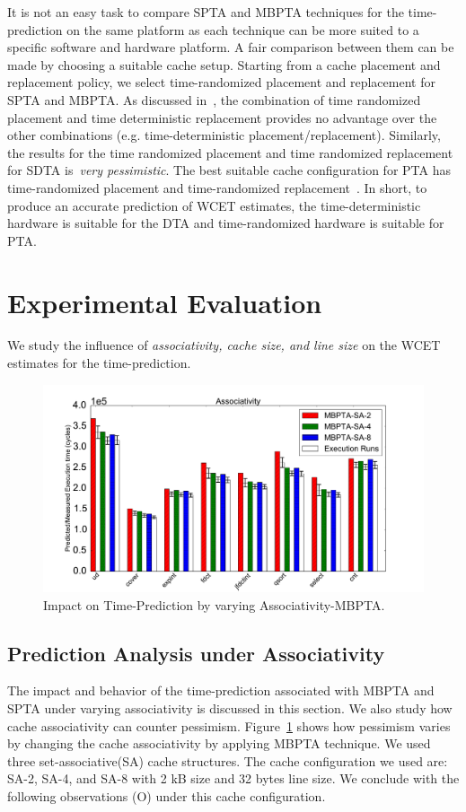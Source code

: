 It is not an easy task to compare SPTA and MBPTA techniques for the time-prediction on the same platform as each technique can be more suited to a specific software and hardware platform. A fair comparison between them can be made by choosing a suitable cache setup. Starting from a cache placement and replacement policy, we select time-randomized placement and replacement for SPTA and MBPTA. As discussed in~\cite{abella2014comparison}, the combination of time randomized placement and time deterministic replacement provides no advantage over the other combinations (e.g. time-deterministic placement/replacement). Similarly, the results for the time randomized placement and time randomized replacement for SDTA is~\textit{very pessimistic}. The best suitable cache configuration for PTA has time-randomized placement and time-randomized replacement~\cite{abella2014comparison}. In short, to produce an accurate prediction of WCET estimates, the time-deterministic hardware is suitable for the DTA and time-randomized hardware is suitable for PTA.
 
\section{Experimental Evaluation}
We study the influence of  \textit{associativity, cache size, and line size} on the WCET estimates for the time-prediction.

 \begin{figure}[tb!]
\centering
\includegraphics[scale=0.4]{figures/mbpta.pdf}
\caption{Impact on Time-Prediction by varying Associativity-MBPTA.}
\label{fig:MBPTA}
\end{figure}


\subsection{{Prediction Analysis under Associativity}}
The impact and behavior of the time-prediction associated with MBPTA and SPTA under varying associativity is discussed in this section. We also study how cache associativity can counter pessimism. 
Figure~\ref{fig:MBPTA} shows how pessimism varies by changing the cache associativity by applying MBPTA technique. We used three set-associative(SA) cache structures. The cache configuration we used are: SA-2, SA-4, and SA-8 with 2 kB size and 32 bytes line size. We conclude with the following observations (O) under this cache configuration.

